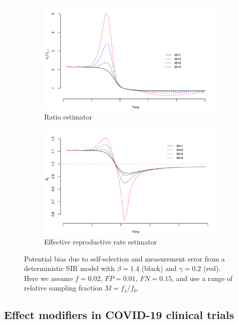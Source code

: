 \documentclass[aoas]{amsart}
\begin{document}
\begin{figure}
\centering
\begin{subfigure}{.5\textwidth}
  \centering
  \includegraphics[width=.9\linewidth]{../methods/figs/sir_ratio.png}
  \caption{Ratio estimator}
  \label{fig:ratio-bias}
\end{subfigure}%
\begin{subfigure}{.5\textwidth}
  \centering
  \includegraphics[width=.9\linewidth]{../methods/figs/sir_rt.png}
  \caption{Effective reproductive rate estimator}
  \label{fig:r0-bias}
\end{subfigure}
\caption{Potential bias due to self-selection and measurement error from a deterministic SIR model with $\beta = 1.4$ (black) and $\gamma = 0.2$ (red).  Here we assume $f = 0.02$, $FP = 0.01$, $FN = 0.15$, and use a range of relative sampling fraction $M = f_1/f_0$.}
\label{fig:rates}
\end{figure}

\subsection{Effect modifiers in COVID-19 clinical trials}
\end{document}
